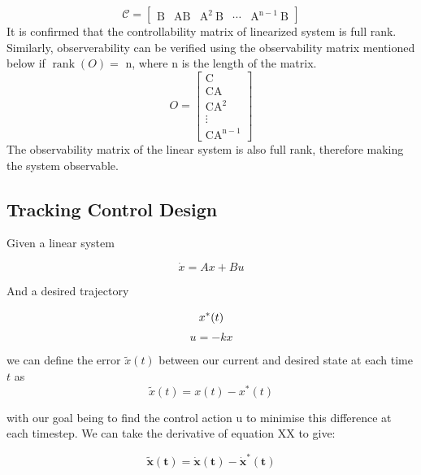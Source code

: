\documentclass{UoNMCHA}
\numberwithin{equation}{section}
\begin{document}
	$$
	\mathcal{C}=\left[\begin{array}{lllll}
	\mathrm{B} & \mathrm{AB} & \mathrm{A}^{2} \mathrm{~B} & \cdots & \mathrm{A}^{\mathrm{n}-1} \mathrm{~B}
	\end{array}\right]
	$$
	It is confirmed that the controllability matrix of linearized system is full rank.
	Similarly, observerability can be verified using the observability matrix mentioned below if $\operatorname{rank}(O)=$
	$\mathrm{n}$, where $\mathrm{n}$ is the length of the matrix.
	$$
	O=\left[\begin{array}{c}
	\mathrm{C} \\
	\mathrm{CA} \\
	\mathrm{CA}^{2} \\
	\vdots \\
	\mathrm{CA}^{\mathrm{n}-1}
	\end{array}\right]
	$$
	The observability matrix of the linear system is also full rank, therefore making the system observable.
	
	\newpage
	\subsection{Tracking Control Design}\label{Tracking Control Design}
	
	Given a linear system
	
	\begin{equation}
	\dot{x}=A x+B u
	\end{equation}
		
	And a desired trajectory

		\begin{equation}
	x^{*}(t) \\
	\end{equation}
		\begin{equation}
	u=-k x
	\end{equation}

	we can define the error $\tilde{x}(t)$ between our current and desired state at each time $t$ as
	\begin{equation}
		\tilde{x}(t)=x(t)-x^{*}(t)
	\end{equation}

	with our goal being to find the control action u to minimise this difference at each timestep.
	We can take the derivative of equation XX to give:
	
	\begin{equation}
	\tilde{\boldsymbol{x}}(\boldsymbol{t})=\dot{\boldsymbol{x}}(\boldsymbol{t})-\dot{\boldsymbol{x}}^{*}(\boldsymbol{t})
	\end{equation}
\end{document}
